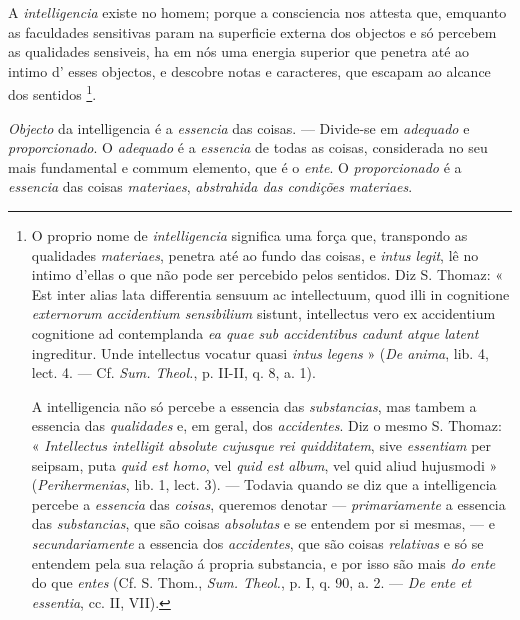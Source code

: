 A \emph{intelligencia} existe no homem; porque a consciencia nos attesta que, emquanto as faculdades sensitivas param na superficie externa dos objectos e só percebem as qualidades sensiveis, ha em nós uma energia superior que penetra até ao intimo d' esses objectos, e descobre notas e caracteres, que escapam ao alcance dos sentidos \footnote{O proprio nome de \emph{intelligencia} significa uma força que, transpondo as qualidades \emph{materiaes}, penetra até ao fundo das coisas, e \emph{intus legit}, lê no intimo d'ellas o que não pode ser percebido pelos sentidos. Diz S. Thomaz: « Est inter alias lata differentia sensuum ac intellectuum, quod illi in cognitione \emph{externorum accidentium sensibilium} sistunt, intellectus vero ex accidentium cognitione ad contemplanda \emph{ea quae sub accidentibus cadunt atque latent} ingreditur. Unde intellectus vocatur quasi \emph{intus legens} » (\emph{De anima}, lib. 4, lect. 4. --- Cf. \emph{Sum. Theol.}, p. II-II, q. 8, a. 1).\par A intelligencia não só percebe a essencia das \emph{substancias}, mas tambem a essencia das \emph{qualidades} e, em geral, dos \emph{accidentes}. Diz o mesmo S. Thomaz: « \emph{Intellectus intelligit absolute cujusque rei quidditatem}, sive \emph{essentiam} per seipsam, puta \emph{quid est homo}, vel \emph{quid est album}, vel quid aliud hujusmodi » (\emph{Perihermenias}, lib. 1, lect. 3). --- Todavia quando se diz que a intelligencia percebe a \emph{essencia} das \emph{coisas}, queremos denotar --- \emph{primariamente} a essencia das \emph{substancias}, que são coisas \emph{absolutas} e se entendem por si mesmas, --- e \emph{secundariamente} a essencia dos \emph{accidentes}, que são coisas \emph{relativas} e só se entendem pela sua relação á propria substancia, e por isso são mais \emph{do ente} do que \emph{entes} (Cf. S. Thom., \emph{Sum. Theol.}, p. I, q. 90, a. 2. --- \emph{De ente et essentia}, cc. II, VII).}.


\emph{Objecto} da intelligencia é a \emph{essencia} das coisas. --- Divide-se em \emph{adequado} e \emph{proporcionado}. O \emph{adequado} é a \emph{essencia} de todas as coisas, considerada no seu mais fundamental e commum elemento, que é o \emph{ente}. O \emph{proporcionado} é a \emph{essencia} das coisas \emph{materiaes}, \emph{abstrahida das condições materiaes}.

